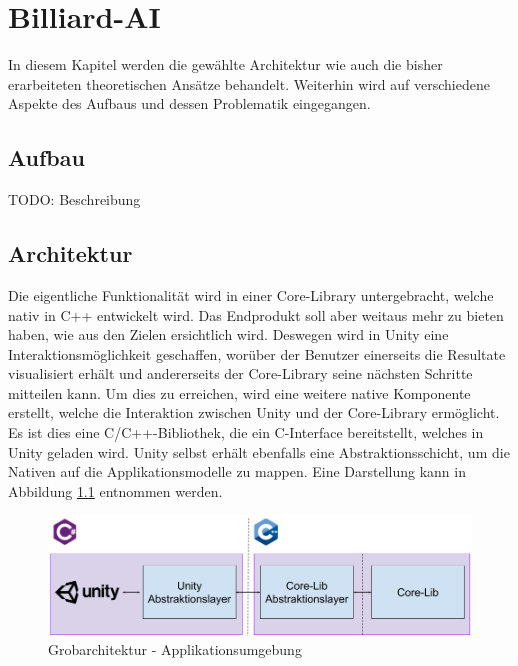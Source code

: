 \chapter{Billiard-AI}
In diesem Kapitel werden die gewählte Architektur wie auch die bisher erarbeiteten theoretischen Ansätze behandelt.
Weiterhin wird auf verschiedene Aspekte des Aufbaus und dessen Problematik eingegangen.

\section{Aufbau}
TODO: Beschreibung

\section{Architektur}
Die eigentliche Funktionalität wird in einer Core-Library untergebracht, welche nativ in C++ entwickelt wird. Das
Endprodukt soll aber weitaus mehr zu bieten haben, wie aus den Zielen ersichtlich wird. Deswegen wird in Unity eine
Interaktionsmöglichkeit geschaffen, worüber der Benutzer einerseits die Resultate visualisiert erhält und
andererseits der Core-Library seine nächsten Schritte mitteilen kann. Um dies zu erreichen, wird eine weitere native
Komponente erstellt, welche die Interaktion zwischen Unity und der Core-Library ermöglicht. Es ist dies eine C/C++-Bibliothek,
die ein C-Interface bereitstellt, welches in Unity geladen wird. Unity selbst erhält ebenfalls eine Abstraktionsschicht,
um die Nativen auf die Applikationsmodelle zu mappen. Eine Darstellung kann in Abbildung \ref{fig:top-level-architecture} entnommen
werden.

\begin{figure}[h!]
    \begin{center}
        \includegraphics[width=0.8\linewidth]{../common/03_billiard_ai/resources/00_top_level_architecture.png}
    \end{center}
    \caption{Grobarchitektur - Applikationsumgebung}
    \label{fig:top-level-architecture}
\end{figure}

